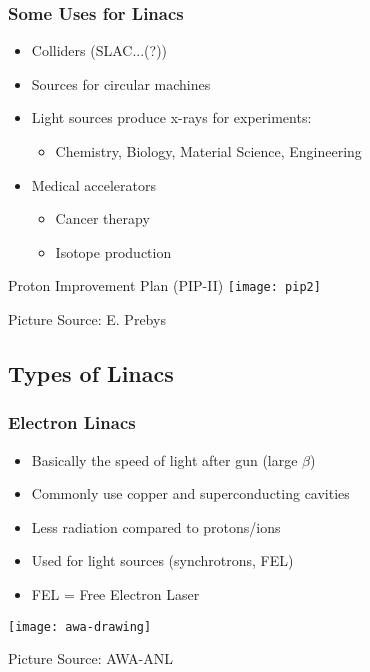 \documentclass[professionalfonts,t]{beamer}
\begin{document}
\begin{frame}
\frametitle{Some Uses for Linacs}
\vspace{-0.5em}
\begin{minipage}{0.45\textwidth}
	\begin{itemize}
		\item Colliders (SLAC...(?))
		\item Sources for circular machines
		\item Light sources produce x-rays for experiments:
		\begin{itemize}
			\item Chemistry, Biology, Material Science, Engineering
		\end{itemize}
		\item Medical accelerators 
		\begin{itemize}
			\item Cancer therapy 
			\item Isotope production
		\end{itemize}
	\end{itemize}
\end{minipage}\hfill
\begin{minipage}{0.5\textwidth}
	\centering
	\vspace{-1.25em}
	
	\small Proton Improvement Plan (PIP-II)
	\texttt{[image: pip2]}
	
	\vspace{-0.25em}
	Picture Source: E. Prebys
\end{minipage}
\end{frame}


\subsection{Types of Linacs}
\begin{frame}[containsverbatim]
\frametitle{Electron Linacs}
\begin{itemize}
	\item Basically the speed of light after gun (large $\beta$)
	\item Commonly use copper and superconducting cavities
	\item Less radiation compared to protons/ions
	\item Used for light sources (synchrotrons, FEL)
	\item FEL = Free Electron Laser
\end{itemize}

\texttt{[image: awa-drawing]}

\hfill Picture Source: AWA-ANL
\end{frame}
\end{document}
